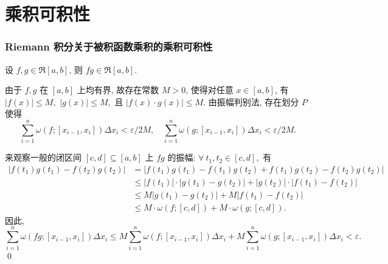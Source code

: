 
\section[乘积可积]{乘积可积性}


\begin{frame}
\frametitle{Riemann 积分关于被积函数乘积的乘积可积性}

\begin{prop}[乘积可积性]
设 $f, g \in \mathfrak{R}[a, b]$, 则 $fg \in \mathfrak{R}[a, b].$
\end{prop}

\pause
\vspace{0.5em}

\startproof[bg=yellow, fg=red]
由于 $f, g$ 在 $[a, b]$ 上均有界, 故存在常数 $M > 0$, 使得对任意 $x \in [a, b]$, 有 $|f(x)| \leqslant M,$ $|g(x)| \leqslant M,$ 且 $|f(x) \cdot g(x)| \leqslant M.$ 由振幅判别法, 存在划分 $P$ 使得
\[
\sum_{i=1}^n \omega(f; [x_{i-1}, x_i]) \Delta x_i < \varepsilon / 2M, \quad \sum_{i=1}^n \omega(g; [x_{i-1}, x_i]) \Delta x_i < \varepsilon / 2M.
\]

\pause
\vspace{0.5em}

来观察一般的闭区间 $[c, d] \subseteq [a, b]$ 上 $fg$ 的振幅: $\forall ~ t_1, t_2 \in [c, d],$ 有
\begin{align*}
|f(t_1) g(t_1) - f(t_2) g(t_2)| & = |f(t_1) g(t_1) - f(t_1) g(t_2) + f(t_1) g(t_2) - f(t_2) g(t_2)| \\
& \leqslant |f(t_1)| \cdot |g(t_1) - g(t_2)| + |g(t_2)| \cdot |f(t_1) - f(t_2)| \\
& \leqslant M |g(t_1) - g(t_2)| + M |f(t_1) - f(t_2)| \\
& \leqslant M \cdot \omega(f; [c, d]) + M \cdot \omega(g; [c, d]).
\end{align*}
因此,
\[
\sum_{i=1}^n \omega(fg; [x_{i-1}, x_i]) \Delta x_i \leqslant M \sum_{i=1}^n \omega(f; [x_{i-1}, x_i]) \Delta x_i + M \sum_{i=1}^n \omega(g; [x_{i-1}, x_i]) \Delta x_i < \varepsilon.
\]
\qed

\end{frame}


